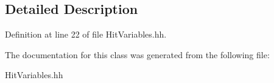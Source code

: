 \subsection{Detailed Description}


Definition at line 22 of file Hit\-Variables.\-hh.



The documentation for this class was generated from the following file\-:\begin{DoxyCompactItemize}
\item 
Hit\-Variables.\-hh\end{DoxyCompactItemize}
